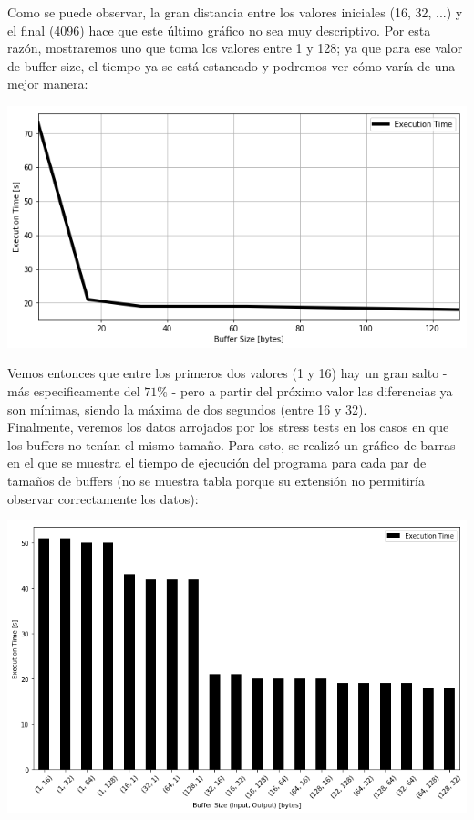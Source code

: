 \documentclass[a4paper, 10pt]{article}
\newcommand\tab[1][0.5cm]{\hspace*{#1}}
\begin{document}
    			\tab Como se puede observar, la gran distancia entre los valores iniciales (16, 32, ...) y el final (4096) hace que este
    			último gráfico no sea muy descriptivo. Por esta razón, mostraremos uno que toma los valores entre 1 y 128; ya que para
    			ese valor de buffer size, el tiempo ya se está estancado y podremos ver cómo varía de una mejor manera:
    			\begin{center}
		       \includegraphics[width=\textwidth]{images/stressEqualsCloseUp}
    			\end{center}
    			\tab Vemos entonces que entre los primeros dos valores (1 y 16) hay un gran salto - más especificamente del $71\%$ - pero
    			a partir del próximo valor las diferencias ya son mínimas, siendo la máxima de dos segundos (entre 16 y 32). \\
    			\tab Finalmente, veremos los datos arrojados por los stress tests en los casos en que los buffers no tenían el mismo
    			tamaño. Para esto, se realizó un gráfico de barras en el que se muestra el tiempo de ejecución del programa para cada
    			par de tamaños de buffers (no se muestra tabla porque su extensión no permitiría observar correctamente los datos):
    			\begin{center}
		       \includegraphics[width=\textwidth]{images/stressNonEquals}
    			\end{center}
\end{document}
